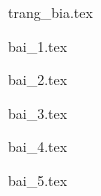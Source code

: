 \documentclass[12pt, a4paper, fleqn]{article}
\begin{document}
	
	\thispagestyle{empty}
	
	{trang_bia.tex}

	\begin{center}
	    \tableofcontents
	\end{center}
	\clearpage
	
	
    {bai_1.tex}
	
	{bai_2.tex}
	
	{bai_3.tex}
	
	{bai_4.tex}
	
	{bai_5.tex}
\end{document}
